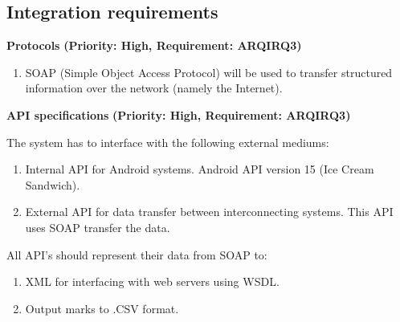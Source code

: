 \documentclass[12pt]{article}
\begin{document}
		
		\subsection{Integration requirements}
		
			\vspace{0.2in}

		\begin{flushleft}
				\textbf{Protocols}
				\newline\textbf{(Priority: High, Requirement: ARQIRQ3)} 
		\end{flushleft}
			
			\vspace{0.05in} 
			
			\begin{enumerate}
				\item SOAP (Simple Object Access Protocol) will be used to transfer 
				structured information over the network (namely the Internet). 
			\end{enumerate}	
			
			\vspace{0.15in}
			
		
\begin{flushleft}
				\textbf{API specifications}
				\newline\textbf{(Priority: High, Requirement: ARQIRQ3)}
\end{flushleft}		
		\vspace{0.05in} 
		
		The system has to interface with the following external mediums:
	\begin{enumerate}
		\item Internal API for Android systems. Android API version 15 (Ice Cream Sandwich). 
		\item External API for data transfer between interconnecting systems. This API uses SOAP 				transfer the data.
	\end{enumerate}
	\vspace{0.05in} 
	
	All API's should represent their data from SOAP to:
	\begin{enumerate}
					\item XML for interfacing with web servers using WSDL.
					\item Output marks to .CSV format.					
	\end{enumerate}
		
		\vspace{0.15in}
			
\end{document}
